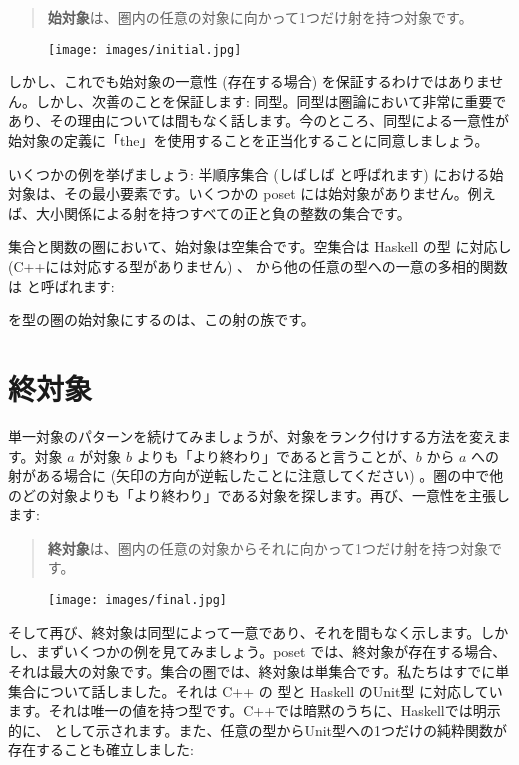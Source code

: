 \begin{quote}
  \textbf{始対象}は、圏内の任意の対象に向かって1つだけ射を持つ対象です。
\end{quote}

\begin{figure}[H]
  \centering
  \texttt{[image: images/initial.jpg]}
\end{figure}

\noindent
しかし、これでも始対象の一意性 (存在する場合) を保証するわけではありません。しかし、次善のことを保証します: 同型。同型は圏論において非常に重要であり、その理由については間もなく話します。今のところ、同型による一意性が始対象の定義に「the」を使用することを正当化することに同意しましょう。

いくつかの例を挙げましょう: 半順序集合 (しばしば  と呼ばれます) における始対象は、その最小要素です。いくつかの poset には始対象がありません。例えば、大小関係による射を持つすべての正と負の整数の集合です。

集合と関数の圏において、始対象は空集合です。空集合は Haskell の型  に対応し (C++には対応する型がありません) 、 から他の任意の型への一意の多相的関数は  と呼ばれます:

 を型の圏の始対象にするのは、この射の族です。

\section{終対象}

単一対象のパターンを続けてみましょうが、対象をランク付けする方法を変えます。対象 $a$ が対象 $b$ よりも「より終わり」であると言うことが、$b$ から $a$ への射がある場合に (矢印の方向が逆転したことに注意してください) 。圏の中で他のどの対象よりも「より終わり」である対象を探します。再び、一意性を主張します:

\begin{quote}
  \textbf{終対象}は、圏内の任意の対象からそれに向かって1つだけ射を持つ対象です。
\end{quote}

\begin{figure}[H]
  \centering
  \texttt{[image: images/final.jpg]}
\end{figure}

\noindent
そして再び、終対象は同型によって一意であり、それを間もなく示します。しかし、まずいくつかの例を見てみましょう。poset では、終対象が存在する場合、それは最大の対象です。集合の圏では、終対象は単集合です。私たちはすでに単集合について話しました。それは C++ の  型と Haskell のUnit型 \code{()} に対応しています。それは唯一の値を持つ型です。C++では暗黙のうちに、Haskellでは明示的に、\code{()} として示されます。また、任意の型からUnit型への1つだけの純粋関数が存在することも確立しました:

